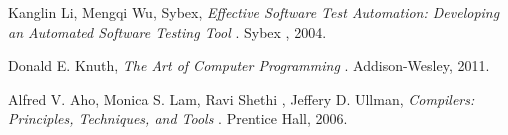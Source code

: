 \begin{thebibliography}{9}

   Kanglin Li, Mengqi Wu, Sybex,
   \emph{ Effective Software Test Automation: Developing an Automated Software Testing Tool  }.
   Sybex ,
   2004.

   Donald E. Knuth,
   \emph{ The Art of Computer Programming  }.
   Addison-Wesley,
   2011.

   Alfred V. Aho, Monica S. Lam, Ravi Shethi , Jeffery D. Ullman,
   \emph{ Compilers: Principles, Techniques, and Tools  }.
   Prentice Hall,
   2006.


\end{thebibliography}